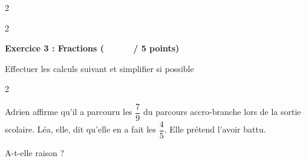 \documentclass[12pt,a4paper]{exam}
\begin{document}
\begin{questions}
\begin{multicols}{2}
    \end{multicols}
    \begin{multicols}{2}
    \end{multicols}
    
\end{questions}

\vspace{20pt}

\noindent
\textbf{Exercice 3 : Fractions (\ \ \ \ \ \  / 5 points)}
\vspace{5pt}

\begin{questions}

    \question[2] Effectuer les calculs suivant et simplifier si possible
    \begin{multicols}{2}
    \end{multicols}

    \vspace{5pt}
    
    \question[3] Adrien affirme qu'il a parcouru les $\dfrac{7}{9}$ du parcours accro-branche lors 
    de la sortie scolaire. Léa, elle, dit qu'elle en a fait les $\dfrac{4}{5}$. Elle prétend l'avoir battu. 
    \vspace{5pt}
    
    A-t-elle raison ?

\end{questions}
\end{document}
